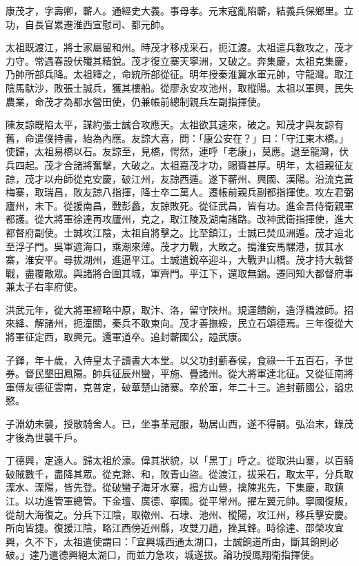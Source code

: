 \begin{pinyinscope}
康茂才，字壽卿，蘄人。通經史大義。事母孝。元末寇亂陷蘄，結義兵保鄉里。立功，自長官累遷淮西宣慰司、都元帥。

太祖既渡江，將士家屬留和州。時茂才移戍采石，扼江渡。太祖遣兵數攻之，茂才力守。常遇春設伏殲其精銳。茂才復立寨天寧洲，又破之。奔集慶，太祖克集慶，乃帥所部兵降。太祖釋之，命統所部從征。明年授秦淮翼水軍元帥，守龍灣。取江陰馬馱沙，敗張士誠兵，獲其樓船。從廖永安攻池州，取樅陽。太祖以軍興，民失農業，命茂才為都水營田使，仍兼帳前總制親兵左副指揮使。

陳友諒既陷太平，謀約張士誠合攻應天。太祖欲其速來，破之。知茂才與友諒有舊，命遣僕持書，紿為內應。友諒大喜，問：「康公安在？」曰：「守江東木橋。」使歸，太祖易橋以石。友諒至，見橋，愕然，連呼「老康」，莫應。退至龍灣，伏兵四起。茂才合諸將奮擊，大破之。太祖嘉茂才功，賜賚甚厚。明年，太祖親征友諒，茂才以舟師從克安慶，破江州，友諒西遁。遂下蘄州、興國、漢陽。沿流克黃梅寨，取瑞昌，敗友諒八指揮，降士卒二萬人。遷帳前親兵副都指揮使。攻左君弼廬州，未下。從援南昌，戰彭蠡，友諒敗死。從征武昌，皆有功。進金吾侍衛親軍都護。從大將軍徐達再攻廬州，克之，取江陵及湖南諸路。改神武衛指揮使，進大都督府副使。士誠攻江陰，太祖自將擊之。比至鎮江，士誠已焚瓜洲遁。茂才追北至浮子門。吳軍遮海口，乘潮來薄。茂才力戰，大敗之。搗淮安馬騾港，拔其水寨，淮安平。尋拔湖州，進逼平江。士誠遣銳卒迎斗，大戰尹山橋。茂才持大戟督戰，盡覆敵眾。與諸將合圍其城，軍齊門。平江下，還取無錫。遷同知大都督府事兼太子右率府使。

洪武元年，從大將軍經略中原，取汴、洛，留守陜州。規運饋餉，造浮橋渡師。招來絳、解諸州，扼潼關，秦兵不敢東向。茂才善撫綏，民立石頌德焉。三年復從大將軍征定西，取興元。還軍道卒。追封蘄國公，謚武康。

子鐸，年十歲，入侍皇太子讀書大本堂。以父功封蘄春侯，食祿一千五百石，予世券。督民墾田鳳陽。帥兵征辰州蠻，平施、疊諸州。從大將軍達北征。又從征南將軍傅友德征雲南，克普定，破華楚山諸寨。卒於軍，年二十三。追封蘄國公，謚忠愍。

子淵幼未襲，授散騎舍人。已，坐事革冠服，勒居山西，遂不得嗣。弘治末，錄茂才後為世襲千戶。

丁德興，定遠人。歸太祖於濠。偉其狀貌，以「黑丁」呼之。從取洪山寨，以百騎破賊數千，盡降其眾。從克滁、和，敗青山盜。從渡江，拔采石，取太平，分兵取溧水、溧陽，皆先登。從破蠻子海牙水寨，搗方山營，擒陳兆先，下集慶，取鎮江。以功進管軍總管。下金壇、廣德、寧國。從平常州。擢左翼元帥。寧國復叛，從胡大海復之。分兵下江陰，取徽州、石埭、池州、樅陽，攻江州，移兵擊安慶。所向皆捷。復援江陰，略江西傍近州縣，攻雙刀趙，挫其鋒。時徐達、邵榮攻宜興，久不下，太祖遣使謂曰：「宜興城西通太湖口，士誠餉道所由，斷其餉則必破。」達乃遣德興絕太湖口，而並力急攻，城遂拔。論功授鳳翔衛指揮使。


\end{pinyinscope}
